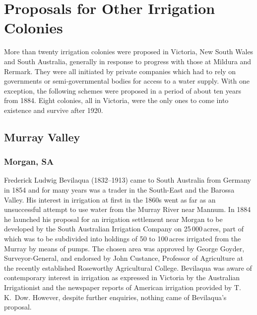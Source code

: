 
\chapter{Proposals for Other Irrigation Colonies}

\label{ch:proposals}

\setcounter{endnote}{0}

More than twenty irrigation colonies were proposed in Victoria, New
South Wales and South Australia, generally in response to progress
with those at Mildura and Rermark. They were all initiated by private
companies which had to rely on governments or semi-governmental bodies
for access to a water supply. With one exception, the following
schemes were proposed in a period of about ten years from 1884.  Eight
colonies, all in Victoria, were the only ones to come into existence
and survive after 1920.

\section*{Murray Valley}

\subsection*{Morgan, SA} 

Frederick Ludwig Bevilaqua (1832--1913)  came
to South Australia from Germany in 1854 and for many years was a
trader in the South-East and the Barossa Valley.  His interest in irrigation at first in the 1860s went as
far as an unsuccessful attempt to use water from the Murray River
 near Mannum.  In 1884 he
launched his proposal for an irrigation settlement near Morgan to be
developed by the South Australian Irrigation Company
 on 25\,000\,acres, part of which was to
be subdivided into holdings of 50 to 100\,acres irrigated from the
Murray by means of pumps.  The chosen area was approved by George
Goyder, Surveyor-General,   and endorsed by John
Custance,  Professor of Agriculture at the recently
established Roseworthy Agricultural College.   Bevilaqua was aware of contemporary interest
in irrigation as expressed in Victoria by the Australian Irrigationist
and the newspaper reports of American irrigation
provided by T.\,K.~Dow.  However, despite further
enquiries, nothing came of Bevilaqua's proposal.

